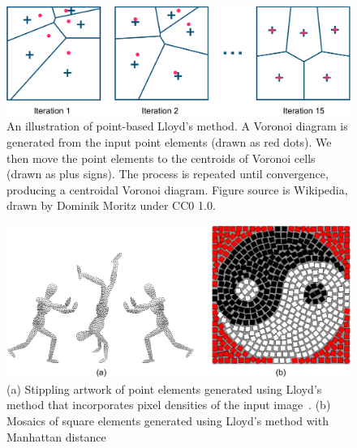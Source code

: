 \begin{figure}
\centering
\includegraphics[width=1.0\textwidth]{figures/related/lloyds_method.pdf} 
\caption[An illustration of Lloyd's method.]
{\label{fig_lloyds_method} 
\newtext
{
An illustration of point-based Lloyd's method.
A Voronoi diagram is generated from the input point elements (drawn as red dots).
We then move the point elements to the centroids of Voronoi cells (drawn as plus signs).
The process is repeated until convergence, producing a centroidal Voronoi diagram.
Figure source is Wikipedia, drawn by Dominik Moritz under CC0 1.0.
}
}
\end{figure}


\begin{figure}
\centering
\includegraphics[width=1.0\textwidth]{figures/related/secord_hausner.pdf} 
\caption[Stippling artwork and traditional mosaics]
{\label{fig_related_secord_hausner} 
\newtext
{
(a) Stippling artwork of point elements generated using Lloyd's method 
that incorporates pixel densities of the input image~\cite{Secord2002}.
(b) Mosaics of square elements generated using Lloyd's method with Manhattan distance~\cite{Hausner2001}
}
}
\end{figure}

